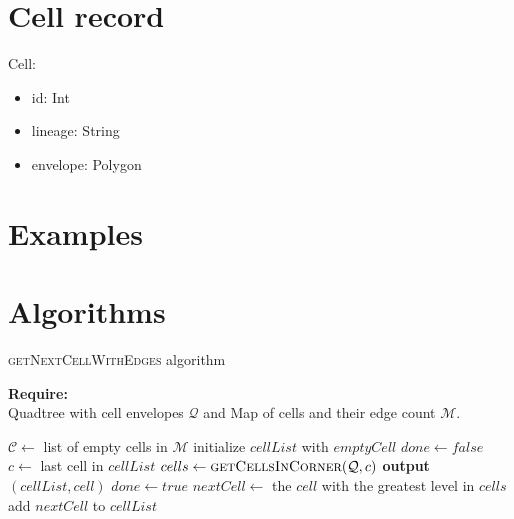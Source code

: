 \documentclass{article}
\begin{document}
    \section*{Cell record}
    Cell:
    \begin{itemize}
        \item id: Int
        \item lineage: String
        \item envelope: Polygon
    \end{itemize}
    
    \section*{Examples}
    
    
    \section*{Algorithms}
    \begin{algorithm} \caption{\textsc{getNextCellWithEdges} algorithm}
        \textbf{Require:} \\ Quadtree with cell envelopes $\mathcal Q$ and Map of cells and their edge count $\mathcal M$.
        \begin{algorithmic}[1]
            \State $\mathcal C \gets $ list of empty cells in $\mathcal M$
                \State initialize $cellList$ with $emptyCell$ 
                \State $done \gets false$
                \Repeat
                    \State $c \gets $ last cell in $cellList$ 
                    \State $cells \gets \textsc{getCellsInCorner}(\mathcal Q, c)$ 
                        \State \textbf{output} $(cellList, cell)$
                        \State $done \gets true$
                    \Else
                        \State $nextCell \gets$ the $cell$ with the greatest level in $cells$
                        \State add $nextCell$ to $cellList$
                    \EndIf
            \EndFor
        \EndFunction
        \end{algorithmic}
    \end{algorithm}
\end{document}
